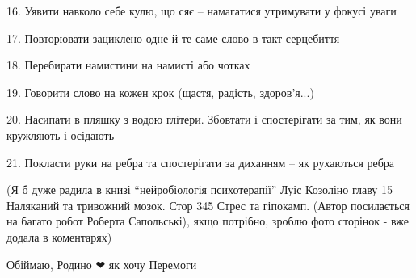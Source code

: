 16. Уявити навколо себе кулю, що сяє – намагатися утримувати у фокусі уваги

17. Повторювати зациклено одне й те саме слово в такт серцебиття

18. Перебирати намистини на намисті або чотках

19. Говорити слово на кожен крок (щастя, радість, здоров'я...)

20. Насипати в пляшку з водою глітери. Збовтати і спостерігати за тим, як вони
кружляють і осідають

21. Покласти руки на ребра та спостерігати за диханням – як рухаються ребра

(Я б дуже радила в книзі \enquote{нейробіологія психотерапії} Луіс Козоліно главу 15
Наляканий та тривожний мозок. Стор 345 Стрес та гіпокамп. (Автор посилається на
багато робот Роберта Сапольські), якщо потрібно, зроблю фото сторінок - вже
додала в коментарях)

Обіймаю, Родино ❤ як хочу Перемоги
